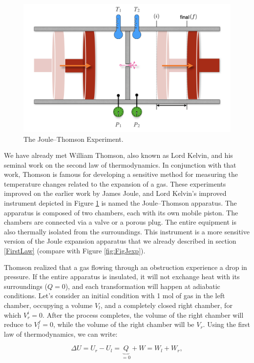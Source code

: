 \documentclass[
  9pt,
]{extbook}
\theoremstyle{definition}
\theoremstyle{definition}
\theoremstyle{definition}
\theoremstyle{remark}
\begin{document}
\begin{figure}

{\centering \includegraphics[width=0.8\linewidth]{./img/OEP_Figures.015} 

}

\caption{The Joule–Thomson Experiment.}\label{fig:FigJT}
\end{figure}

We have already met William Thomson, also known as Lord Kelvin, and his seminal work on the second law of thermodynamics. In conjunction with that work, Thomson is famous for developing a sensitive method for measuring the temperature changes related to the expansion of a gas. These experiments improved on the earlier work by James Joule, and Lord Kelvin's improved instrument depicted in Figure \ref{fig:FigJT} is named the Joule--Thomson apparatus. The apparatus is composed of two chambers, each with its own mobile piston. The chambers are connected via a valve or a porous plug. The entire equipment is also thermally isolated from the surroundings. This instrument is a more sensitive version of the Joule expansion apparatus that we already described in section \ref{FirstLaw} (compare with Figure \ref{fig:FigJexp}).

Thomson realized that a gas flowing through an obstruction experience a drop in pressure. If the entire apparatus is insulated, it will not exchange heat with its surroundings (\(Q=0\)), and each transformation will happen at adiabatic conditions. Let's consider an initial condition with 1 mol of gas in the left chamber, occupying a volume \(V_l\), and a completely closed right chamber, for which \(V_r^i=0\). After the process completes, the volume of the right chamber will reduce to \(V_l^f=0\), while the volume of the right chamber will be \(V_r\). Using the first law of thermodynamics, we can write:

\begin{equation}
\Delta U=U_r-U_l=\underbrace{Q}_{=0}+W=W_l+W_r,
\label{eq:JT1}
\end{equation}
\end{document}
